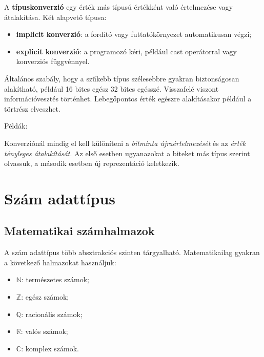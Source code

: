 A \textbf{típuskonverzió} egy érték más típusú értékként való értelmezése vagy átalakítása. Két alapvető típusa:

\begin{itemize}
  \item \textbf{implicit konverzió}: a fordító vagy futtatókörnyezet automatikusan végzi;
  \item \textbf{explicit konverzió}: a programozó kéri, például cast operátorral vagy konverziós függvénnyel.
\end{itemize}

Általános szabály, hogy a szűkebb típus szélesebbre gyakran biztonságosan alakítható, például 16 bites egész 32 bites egésszé. Visszafelé viszont információvesztés történhet. Lebegőpontos érték egészre alakításakor például a törtrész elveszhet.

Példák:


\begin{warningbox}
Konverziónál mindig el kell különíteni a \emph{bitminta újraértelmezését} és az \emph{érték tényleges átalakítását}. Az első esetben ugyanazokat a biteket más típus szerint olvassuk, a második esetben új reprezentáció keletkezik.
\end{warningbox}

\section{Szám adattípus}

\subsection{Matematikai számhalmazok}

A szám adattípus több absztrakciós szinten tárgyalható. Matematikailag gyakran a következő halmazokat használjuk:

\begin{itemize}
  \item $\mathbb{N}$: természetes számok;
  \item $\mathbb{Z}$: egész számok;
  \item $\mathbb{Q}$: racionális számok;
  \item $\mathbb{R}$: valós számok;
  \item $\mathbb{C}$: komplex számok.
\end{itemize}

